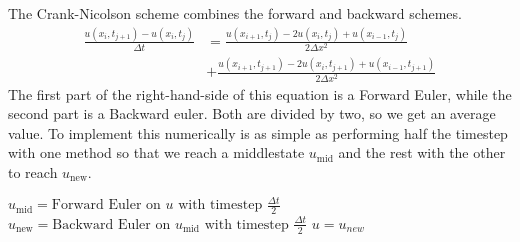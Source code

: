 The Crank-Nicolson scheme combines the forward and backward schemes.
\begin{align*}
    \frac{u(x_i, t_{j+1}) - u(x_i, t_j)}{\Delta t}
    &= \frac{u(x_{i+1}, t_j) - 2u(x_i, t_j) + u(x_{i-1}, t_j)}
            {2 \Delta x^2} \\
    &+ \frac{u(x_{i+1}, t_{j+1}) - 2u(x_i, t_{j+1}) + u(x_{i-1}, t_{j+1})}
            {2 \Delta x^2}
\end{align*}
The first part of the right-hand-side of this equation is a Forward Euler, 
while the second part is a Backward euler. Both are divided by two, so we get 
an average value. To implement this numerically is as simple as performing half
the timestep with one method so that we reach a middlestate $u_\textrm{mid}$ 
and the rest with the other to reach $u_\textrm{new}$.
\begin{algorithmic}
        \State $ u_\textrm{mid} = 
                 \textrm{Forward Euler on } u
                 \textrm{ with timestep } \frac{\Delta t}{2} $
        \State $ u_\textrm{new} = 
                 \textrm{Backward Euler on } u_\textrm{mid}
                 \textrm{ with timestep } \frac{\Delta t}{2} $
        \State $ u = u_{new} $
    \EndFor
\end{algorithmic}
